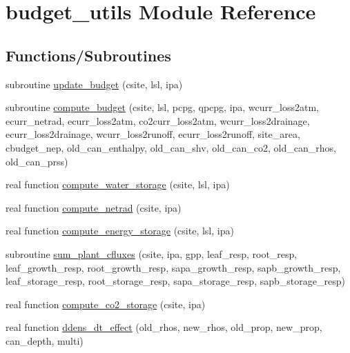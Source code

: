 \hypertarget{namespacebudget__utils}{}\section{budget\+\_\+utils Module Reference}
\label{namespacebudget__utils}
\subsection*{Functions/\+Subroutines}
\begin{DoxyCompactItemize}
\item 
subroutine \hyperlink{namespacebudget__utils_ac092645bc3b3bd0dcfa2cdedc2451c58}{update\+\_\+budget} (csite, lsl, ipa)
\item 
subroutine \hyperlink{namespacebudget__utils_a07d8e19ed53707603c43556eb24b5fea}{compute\+\_\+budget} (csite, lsl, pcpg, qpcpg, ipa, wcurr\+\_\+loss2atm, ecurr\+\_\+netrad, ecurr\+\_\+loss2atm, co2curr\+\_\+loss2atm, wcurr\+\_\+loss2drainage, ecurr\+\_\+loss2drainage, wcurr\+\_\+loss2runoff, ecurr\+\_\+loss2runoff, site\+\_\+area, cbudget\+\_\+nep, old\+\_\+can\+\_\+enthalpy, old\+\_\+can\+\_\+shv, old\+\_\+can\+\_\+co2, old\+\_\+can\+\_\+rhos, old\+\_\+can\+\_\+prss)
\item 
real function \hyperlink{namespacebudget__utils_ad0c764047c557100b3a3cdcd836103a0}{compute\+\_\+water\+\_\+storage} (csite, lsl, ipa)
\item 
real function \hyperlink{namespacebudget__utils_a6111a1c211ecef562368c8635f64af45}{compute\+\_\+netrad} (csite, ipa)
\item 
real function \hyperlink{namespacebudget__utils_a319c5f7252c344bcebbd162593e25ec8}{compute\+\_\+energy\+\_\+storage} (csite, lsl, ipa)
\item 
subroutine \hyperlink{namespacebudget__utils_ae3ca69dd43d1f92a0a86e21fcd57c641}{sum\+\_\+plant\+\_\+cfluxes} (csite, ipa, gpp, leaf\+\_\+resp, root\+\_\+resp, leaf\+\_\+growth\+\_\+resp, root\+\_\+growth\+\_\+resp, sapa\+\_\+growth\+\_\+resp, sapb\+\_\+growth\+\_\+resp, leaf\+\_\+storage\+\_\+resp, root\+\_\+storage\+\_\+resp, sapa\+\_\+storage\+\_\+resp, sapb\+\_\+storage\+\_\+resp)
\item 
real function \hyperlink{namespacebudget__utils_aa1c4f8466010b1673f2914f1bfe9b6ee}{compute\+\_\+co2\+\_\+storage} (csite, ipa)
\item 
real function \hyperlink{namespacebudget__utils_ae7ad8d90c28490b0b1c920e7a2656345}{ddens\+\_\+dt\+\_\+effect} (old\+\_\+rhos, new\+\_\+rhos, old\+\_\+prop, new\+\_\+prop, can\+\_\+depth, multi)
\end{DoxyCompactItemize}


